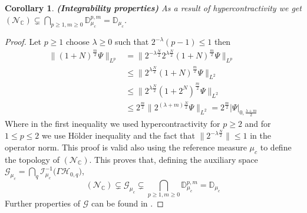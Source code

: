 \documentclass{elsarticle}%
\newtheorem{corollary}[corollary]{Corollary}%
\begin{document}
\begin{corollary}\textbf{(Integrability properties)} As a result of hypercontractivity we get 
$(\mathcal{N}_\mathbb{C})\subsetneq \bigcap\limits_{p\geq1, m\geq 0}\mathbb{D}^{p,m}_{\mu_c}= \mathbb{D}_{\mu_c}$. 
\end{corollary}
\begin{proof} Let $p\geq 1$ choose $\lambda\geq 0$ such that $2^{-\lambda} (p-1)\leq 1$ then 
\begin{align*}
    \lVert (1+N)^{\frac{m}2} \Psi \rVert_{L^p}&= \lVert 2^{-\lambda \frac{N}2}2^{\lambda \frac{N}2}(1+N)^{\frac{m}2} \Psi \rVert_{L^p}\\
    &\leq \lVert 2^{\lambda \frac{N}2}(1+N)^{\frac{m}2} \Psi \rVert_{L^2} \\
    & \leq \lVert 2^{\lambda \frac{N}2}(1+2^N)^{\frac{m}2} \Psi \rVert_{L^2} \\
    & \leq 2^{\frac{m}2}\lVert 2^{(\lambda+m)\frac{N}2} \Psi \rVert_{L^2}= 2^{\frac{m}2} \lvert \Psi \rvert_{0,\frac{\lambda+m}2} 
\end{align*}
Where in the first inequality we used hypercontractivity for $p\geq 2$ and for $1\leq p \leq 2$ we use  Hölder inequality and the fact that $\lVert 2^{-\lambda \frac{N}2}\rVert\leq 1$ in the operator norm. This proof is valid also using the reference measure $\mu_c$ to define the topology of $(\mathcal{N}_\mathbb{C})$.  This proves that, defining the auxiliary space $\mathcal{G}_{\mu_c}= \bigcap\limits_{q} \mathcal{I}_{\mu_c}^{-1}\Big( \Gamma\mathcal{H}_{0,q}\Big)$,  
$$(\mathcal{N}_\mathbb{C})\subsetneq \mathcal{G}_{\mu_c} \subsetneq\bigcap\limits_{p\geq1, m\geq 0}\mathbb{D}^{p,m}_{\mu_c}= \mathbb{D}_{\mu_c}$$
Further properties of $\mathcal{G}$ can be found in \cite{potthoffDualPair1995}. 
\end{proof}



 
\end{document}
